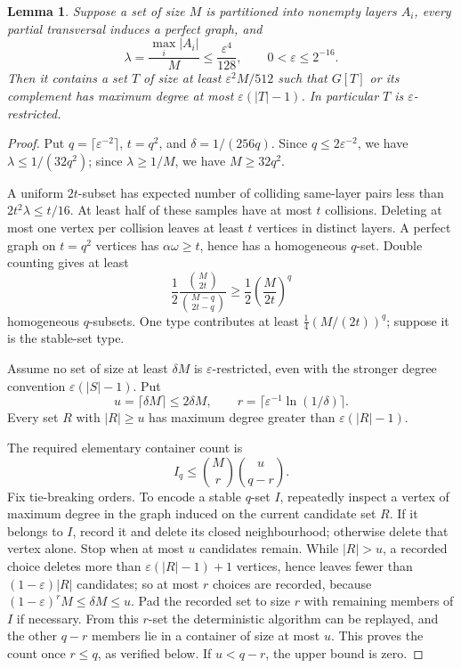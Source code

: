 \documentclass[11pt,a4paper]{article}
\newtheorem{lemma}[theorem]{Lemma}
\theoremstyle{definition}
\theoremstyle{remark}
\numberwithin{equation}{section}
\begin{document}
\begin{lemma}\label{lem:thin}
Suppose a set of size \(M\) is partitioned into nonempty layers \(A_i\), every partial transversal induces a perfect graph, and
\[
 \lambda=\frac{\max_i|A_i|}{M}\le\frac{\varepsilon^4}{128},
 \qquad 0<\varepsilon\le2^{-16}.
\]
Then it contains a set \(T\) of size at least \(\varepsilon^2M/512\) such that \(G[T]\) or its complement has maximum degree at most \(\varepsilon(|T|-1)\). In particular \(T\) is \(\varepsilon\)-restricted.
\end{lemma}
\begin{proof}
Put \(q=\lceil\varepsilon^{-2}\rceil\), \(t=q^2\), and \(\delta=1/(256q)\). Since \(q\le2\varepsilon^{-2}\), we have \(\lambda\le1/(32q^2)\); since \(\lambda\ge1/M\), we have \(M\ge32q^2\).

A uniform \(2t\)-subset has expected number of colliding same-layer pairs less than \(2t^2\lambda\le t/16\). At least half of these samples have at most \(t\) collisions. Deleting at most one vertex per collision leaves at least \(t\) vertices in distinct layers. A perfect graph on \(t=q^2\) vertices has \(\alpha\omega\ge t\), hence has a homogeneous \(q\)-set. Double counting gives at least
\[
 \frac12\frac{\binom{M}{2t}}{\binom{M-q}{2t-q}}
 \ge\frac12\left(\frac M{2t}\right)^q
\]
homogeneous \(q\)-subsets. One type contributes at least \(\tfrac14(M/(2t))^q\); suppose it is the stable-set type.

Assume no set of size at least \(\delta M\) is \(\varepsilon\)-restricted, even with the stronger degree convention \(\varepsilon(|S|-1)\). Put
\[
 u=\lceil\delta M\rceil\le2\delta M,\qquad
 r=\lceil\varepsilon^{-1}\ln(1/\delta)\rceil.
\]
Every set \(R\) with \(|R|\ge u\) has maximum degree greater than \(\varepsilon(|R|-1)\).

The required elementary container count is
\[
 I_q\le\binom Mr\binom u{q-r}.
\]
Fix tie-breaking orders. To encode a stable \(q\)-set \(I\), repeatedly inspect a vertex of maximum degree in the graph induced on the current candidate set \(R\). If it belongs to \(I\), record it and delete its closed neighbourhood; otherwise delete that vertex alone. Stop when at most \(u\) candidates remain. While \(|R|>u\), a recorded choice deletes more than \(\varepsilon(|R|-1)+1\) vertices, hence leaves fewer than \((1-\varepsilon)|R|\) candidates; so at most \(r\) choices are recorded, because \((1-\varepsilon)^rM\le\delta M\le u\). Pad the recorded set to size \(r\) with remaining members of \(I\) if necessary. From this \(r\)-set the deterministic algorithm can be replayed, and the other \(q-r\) members lie in a container of size at most \(u\). This proves the count once \(r\le q\), as verified below. If \(u<q-r\), the upper bound is zero.


\end{proof}
\end{document}
